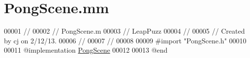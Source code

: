 \hypertarget{_pong_scene_8mm}{\section{Pong\-Scene.\-mm}
\label{dc/da4/_pong_scene_8mm}
}

\begin{DoxyCode}
00001 \textcolor{comment}{//}
00002 \textcolor{comment}{//  PongScene.m}
00003 \textcolor{comment}{//  LeapPuzz}
00004 \textcolor{comment}{//}
00005 \textcolor{comment}{//  Created by cj on 2/12/13.}
00006 \textcolor{comment}{//}
00007 \textcolor{comment}{//}
00008 
00009 \textcolor{preprocessor}{#import "PongScene.h"}
00010 
00011 \textcolor{keyword}{@implementation }\hyperlink{interface_pong_scene}{PongScene}
00012 
00013 \textcolor{keyword}{@end}
\end{DoxyCode}
